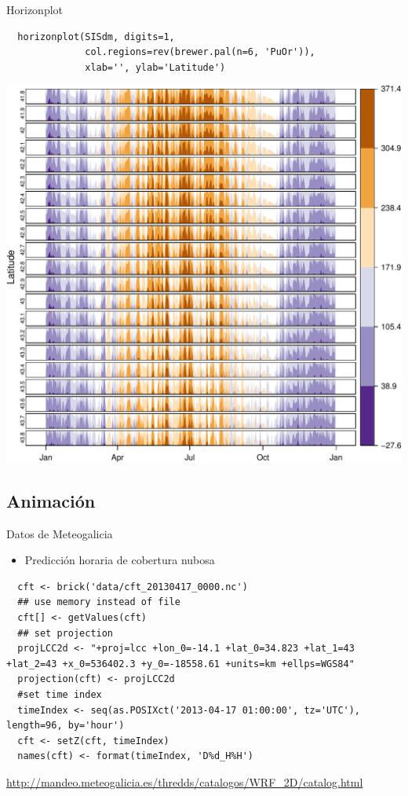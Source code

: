 \documentclass[xcolor={usenames,svgnames,dvipsnames}]{beamer}
\begin{document}
\begin{frame}[fragile,label=sec-4-4-3]{Horizonplot}
 \lstset{language=R,label= ,caption= ,numbers=none}
\begin{lstlisting}
  horizonplot(SISdm, digits=1,
              col.regions=rev(brewer.pal(n=6, 'PuOr')),
              xlab='', ylab='Latitude')
\end{lstlisting}

\includegraphics[width=.9\linewidth]{figs/SISdm_horizonplot.pdf}
\end{frame}


\subsection{Animación}
\label{sec-4-5}

\begin{frame}[fragile,label=sec-4-5-1]{Datos de Meteogalicia}
 \begin{itemize}
\item Predicción horaria de cobertura nubosa
\end{itemize}
\lstset{language=R,label= ,caption= ,numbers=none}
\begin{lstlisting}
  cft <- brick('data/cft_20130417_0000.nc')
  ## use memory instead of file
  cft[] <- getValues(cft)
  ## set projection
  projLCC2d <- "+proj=lcc +lon_0=-14.1 +lat_0=34.823 +lat_1=43 +lat_2=43 +x_0=536402.3 +y_0=-18558.61 +units=km +ellps=WGS84"
  projection(cft) <- projLCC2d
  #set time index
  timeIndex <- seq(as.POSIXct('2013-04-17 01:00:00', tz='UTC'), length=96, by='hour')
  cft <- setZ(cft, timeIndex)
  names(cft) <- format(timeIndex, 'D%d_H%H')
\end{lstlisting}

\begin{block}{\url{http://mandeo.meteogalicia.es/thredds/catalogos/WRF_2D/catalog.html}}
\end{block}
\end{frame}
\end{document}
